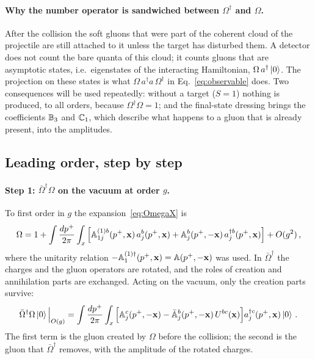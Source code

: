 \paragraph{Why the number operator is sandwiched between $\Omega^\dagger$ and $\Omega$.} After the collision the soft gluons that were part of the coherent cloud of the projectile are still attached to it unless the target has disturbed them. A detector does not count the bare quanta of this cloud; it counts gluons that are asymptotic states, i.e.\ eigenstates of the interacting Hamiltonian, $\Omega\,a^\dagger\ket0$. The projection on these states is what $\Omega\,a^\dagger a\,\Omega^\dagger$ in Eq.~\eqref{eq:observable} does. Two consequences will be used repeatedly: without a target ($S=1$) nothing is produced, to all orders, because $\Omega^\dagger\Omega=1$; and the final-state dressing brings the coefficients $\mathbb{B}_3$ and $\mathbb{C}_1$, which describe what happens to a gluon that is already present, into the amplitudes.

\subsection{Leading order, step by step}\label{sec:LO}

\paragraph{Step 1: $\bar\Omega^\dagger\Omega$ on the vacuum at order $g$.} To first order in $g$ the expansion~\eqref{eq:OmegaX} is
\begin{align}
\Omega=1+\int\frac{dp^+}{2\pi}\int_x\Big[\mathbb{A}^{(1)b}_{1j}(p^+,\mathbf{x})\,a^b_j(p^+,\mathbf{x})+\mathbb{A}^b_j(p^+,-\mathbf{x})\,a^{\dagger b}_j(p^+,\mathbf{x})\Big]+O(g^2)\,,
\end{align}
where the unitarity relation $-\mathbb{A}^{(1)\dagger}_1(p^+,\mathbf{x})=\mathbb{A}(p^+,-\mathbf{x})$ was used. In $\bar\Omega^\dagger$ the charges and the gluon operators are rotated, and the roles of creation and annihilation parts are exchanged. Acting on the vacuum, only the creation parts survive:
\begin{align}\label{eq:LOstate}
\bar\Omega^\dagger\Omega\ket0\Big|_{O(g)}=\int\frac{dp^+}{2\pi}\int_x\Big[\mathbb{A}^c_j(p^+,-\mathbf{x})-\bar{\mathbb{A}}^b_j(p^+,-\mathbf{x})\,U^{bc}(\mathbf{x})\Big]a^{\dagger c}_j(p^+,\mathbf{x})\ket0\,.
\end{align}
The first term is the gluon created by $\Omega$ before the collision; the second is the gluon that $\bar\Omega^\dagger$ removes, with the amplitude of the rotated charges.

